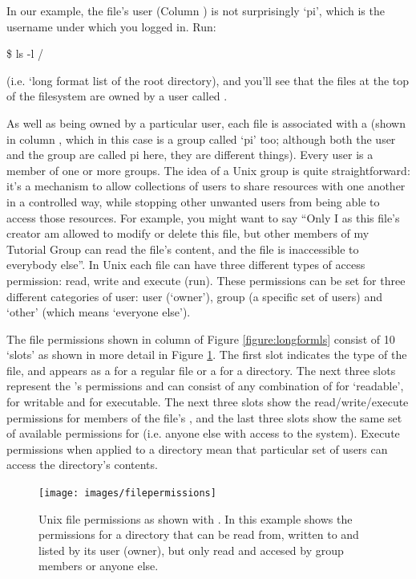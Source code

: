 In our example, the file's user (Column \protect{}) is not
surprisingly `pi', which is the username under which you logged
in. Run:

\begin{ttoutenv}
\$ ls -l /
\end{ttoutenv}

(i.e. `long format list of the root directory), and you'll see that
the files at the top of the filesystem are owned by a user called
.

As well as being owned by a particular user, each file is associated
with a  (shown in column \protect{}, which in
this case is a group called `pi' too; although both the user and the
group are called pi here, they are different things). Every user is a
member of one or more groups. The idea of a Unix group is quite
straightforward: it's a mechanism to allow collections of users to
share resources with one another in a controlled way, while stopping
other unwanted users from being able to access those resources. For
example, you might want to say ``Only I as this file's creator am
allowed to modify or delete this file, but other members of my
Tutorial Group can read the file's content, and the file is
inaccessible to everybody else''. In Unix each file can have three
different types of access permission: read, write and execute
(run). These permissions can be set for three different categories of
user: user (`owner'), group (a specific set of users) and `other'
(which means `everyone else').

The file permissions shown in column \protect{} of Figure
\ref{figure:longformls} consist of 10 `slots' as shown in more detail
in Figure \ref{figure:fileperms}. The first slot indicates the type of
the file, and appears as a \ttout{-} for a regular file or a 
for a directory. The next three slots represent the 's
permissions and can consist of any combination of  for
`readable',  for writable and  for executable. The
next three slots show the read/write/execute permissions for members
of the file's , and the last three slots show the same
set of available permissions for  (i.e. anyone else
with access to the system). Execute permissions when applied to a
directory mean that particular set of users can access the directory's
contents.

\begin{figure}
\centerline{\texttt{[image: images/filepermissions]}}
\caption{Unix file permissions as shown with . In this example shows the permissions for a directory that can be read from, written to and listed by its user (owner), but only read and accesed by group members or anyone else.}\label{figure:fileperms}
\end{figure}

